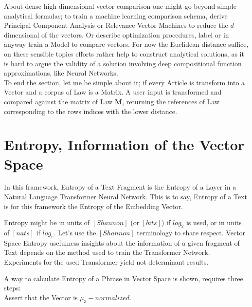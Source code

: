 \documentclass[a4paper,fleqn]{cas-sc}
\begin{document}
\noindent
About dense high dimensional vector comparison one might go beyond simple analytical formulas; to train a machine learning comparison 
schema, derive Principal Component Analysis or Relevance Vector Machines to reduce the $d$-dimensional of the vectors. 
Or describe optimization procedures, label or in anyway train a Model to compare vectors. For now the Euclidean distance suffice, 
on these sensible topics efforts rather help to construct analytical solutions, as it is hard to argue the validity of a 
solution involving deep compositional function approximations, like Neural Networks. \\

\noindent
To end the section, let me be simple about it; if every Article is transform into a Vector and a corpus of Law is a Matrix. 
A user input is transformed and compared against the matrix of Law $\mathbf{M}$, returning the references 
of Law corresponding to the rows indices with the lower distance. 

\newpage
\section{Entropy, Information of the Vector Space}
In this framework, Entropy of a Text Fragment is the Entropy of a Layer in a Natural Language Transformer Neural Network. 
This is to say, Entropy of a Text is for this framework the Entropy of the Embedding Vector. 

\noindent
Entropy might be in units of $[Shannon]$ (or $[bits]$) if $log_{2}$ is used, or in units of $[nats]$ if $log_{e}$. 
Let's use the $[Shannon]$ terminology to share respect. Vector Space Entropy usefulness insights about the information 
of a given fragment of Text depends on the method used to train the Transformer Network. 
Experiments for the used Transformer yield \color{brown}not determinant results\color{black}. 

\noindent
A way to calculate Entropy of a Phrase in Vector Space is shown, requires three steps: \\

\noindent
Assert that the Vector is $\mu_{3}-normalized$. \\
\end{document}
